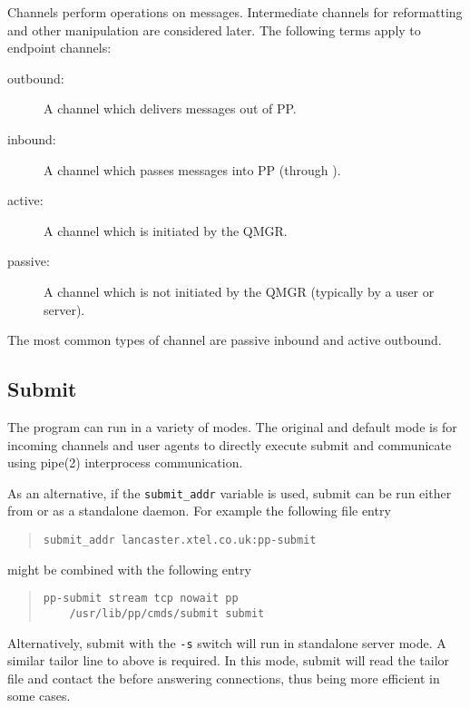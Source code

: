 Channels perform operations on messages.  Intermediate channels for
reformatting and other manipulation are considered later.  The
following terms apply to endpoint channels:

\begin {description}
\item[outbound:]  A channel which delivers messages out of PP.

\item[inbound:]  A channel which passes messages into PP 
(through ).

\item[active:] A channel which is initiated by the QMGR.

\item[passive:] A channel which is not initiated by the QMGR (typically by a
user or server).

\end {description}

The most common types of channel are passive inbound and active outbound.

\subsection	{Submit}\label{sect:submit}

The  program can run in a variety of modes. The original
and default mode is for incoming channels and user agents to directly
execute submit and communicate using \man pipe(2) interprocess
communication.

As an alternative, if the \verb|submit_addr| variable is used, submit
can be run either from  or as a standalone daemon.
For example the
following  file entry
\begin{quote}\begin{verbatim}
submit_addr	lancaster.xtel.co.uk:pp-submit
\end{verbatim}\end{quote}
might be combined with the following  entry
\begin{quote}\begin{verbatim}
pp-submit stream tcp nowait pp 
    /usr/lib/pp/cmds/submit submit
\end{verbatim}\end{quote}

Alternatively, submit with the \verb|-s| switch will run in standalone
server mode. A similar tailor line to above is required. In this mode,
submit will read the tailor file and contact the  before
answering connections, thus being more efficient in some cases.

